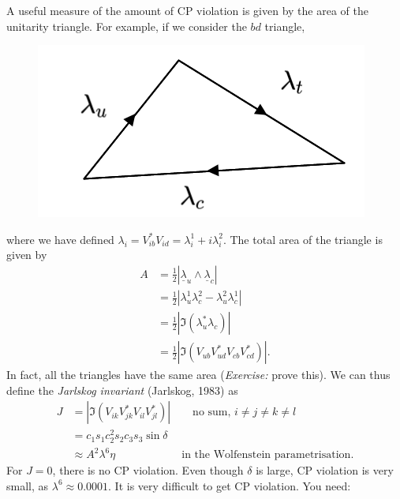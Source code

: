 A useful measure of the amount of CP violation is given by the area of the unitarity triangle. For example, if we consider the $bd$ triangle,
\newline
\begin{figure}
  \centering
  \includegraphics[width=\linewidth]{figs/48a.png}
\end{figure}
where we have defined $\lambda_i = V_{ib}^* V_{id} = \lambda_i^1 + i \lambda_i^2$. The total area of the triangle is given by
\begin{equation}
\begin{split}
A &= \frac{1}{2}|\underline{\lambda}_u \wedge \underline{\lambda}_c| \\
&= \frac{1}{2}|\lambda_u^1 \lambda_c^2 - \lambda_u^2 \lambda_c^1| \\
&=\frac{1}{2}|\Im(\lambda_u^* \lambda_c)| \\
&= \frac{1}{2}|\Im(V_{ub}V^*_{ud} V_{cb} V^*_{cd})|.
\end{split}
\end{equation}
In fact, all the triangles have the same area (\textit{Exercise:} prove this). We can thus define the \textit{Jarlskog invariant} (Jarlskog, 1983) as
\begin{equation}
\begin{split}
J &= |\Im(V_{ik}V^*_{jk}V_{il}V^*_{jl})| \qquad \text{no sum, } i\neq j \neq k \neq l \\
&=c_1s_1c_2^2s_2c_3s_3\sin\delta \\
&\approx A^2\lambda^6\eta \qquad  \qquad  \qquad \text{in the Wolfenstein parametrisation}.
\end{split}
\end{equation}
For $J=0$, there is no CP violation. Even though $\delta$ is large, CP violation is very small, as $\lambda^6 \approx 0.0001$. It is very difficult to get CP violation. You need:
